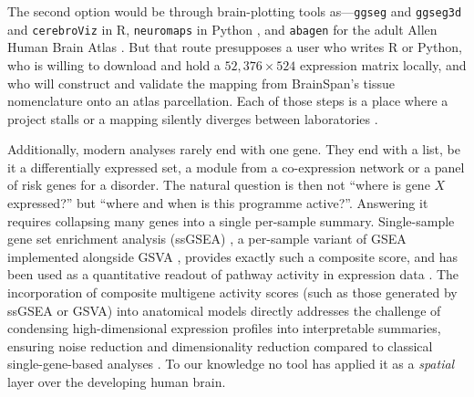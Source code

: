 \documentclass[pdflatex,sn-basic]{sn-jnl}
\begin{document}
The second option would be through brain-plotting
tools as---\texttt{ggseg} and \texttt{ggseg3d} \citep{Mowinckel2020} and
\texttt{cerebroViz} \citep{Bahl2017} in R, \texttt{neuromaps} in Python
\citep{Markello2022}, and \texttt{abagen} for the adult Allen Human Brain Atlas
\citep{Hawrylycz2012,Markello2021}. But that route presupposes a user who
writes R or Python, who is willing to download and hold a $52{,}376 \times 524$
expression matrix locally, and who will construct and validate the mapping from
BrainSpan's tissue nomenclature onto an atlas parcellation. Each of those steps
is a place where a project stalls or a mapping silently diverges between
laboratories \citep{Markello2021}.

Additionally, modern analyses rarely end
with one gene. They end with a list, be it a differentially expressed set, a module
from a co-expression network or a panel of risk genes for a disorder. The natural
question is then not ``where is gene $X$ expressed?'' but ``where and when is
this programme active?''. Answering it requires collapsing many genes
into a single per-sample summary. Single-sample gene set enrichment analysis
(ssGSEA) \citep{Barbie2009}, a per-sample variant of GSEA
\citep{Subramanian2005} implemented alongside GSVA \citep{Hanzelmann2013},
provides exactly such a composite score, and has been used as a quantitative
readout of pathway activity in expression data
\citep{Yi2020}. The incorporation of composite multigene activity scores (such as those generated by ssGSEA or GSVA) into anatomical models directly addresses the challenge of condensing high-dimensional expression profiles into interpretable summaries, ensuring noise reduction and dimensionality reduction compared to classical single-gene-based analyses \citep{Hanzelmann2013}. To our knowledge no tool has applied it as a
\emph{spatial} layer over the developing human brain.
\end{document}
